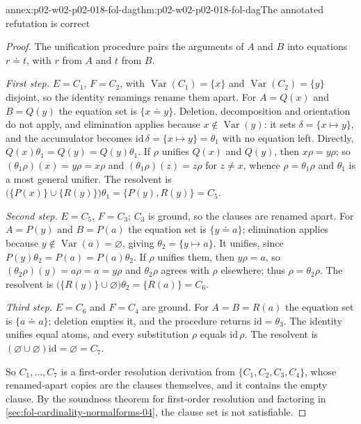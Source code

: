 \begin{annexitem}{annex:p02-w02-p02-018-fol-dag}{thm:p02-w02-p02-018-fol-dag}{The annotated refutation is correct}
\begin{proof}
The unification procedure pairs the arguments of \(A\) and \(B\) into
equations \(r\doteq t\), with \(r\) from \(A\) and \(t\) from \(B\).

\emph{First step.}  \(E=C_1\), \(F=C_2\), with
\(\operatorname{Var}(C_1)=\{x\}\) and \(\operatorname{Var}(C_2)=\{y\}\)
disjoint, so the identity renamings rename them apart.  For \(A=Q(x)\) and
\(B=Q(y)\) the equation set is \(\{x\doteq y\}\).  Deletion, decomposition and
orientation do not apply, and elimination applies because
\(x\notin\operatorname{Var}(y)\): it sets \(\delta=\{x\mapsto y\}\), and the
accumulator becomes \(\mathrm{id}\,\delta=\{x\mapsto y\}=\theta_1\) with no
equation left.  Directly, \(Q(x)\theta_1=Q(y)=Q(y)\theta_1\).  If \(\rho\)
unifies \(Q(x)\) and \(Q(y)\), then \(x\rho=y\rho\); so
\((\theta_1\rho)(x)=y\rho=x\rho\) and \((\theta_1\rho)(z)=z\rho\) for
\(z\ne x\), whence \(\rho=\theta_1\rho\) and \(\theta_1\) is a most general
unifier.  The resolvent is
\(\bigl(\{P(x)\}\cup\{R(y)\}\bigr)\theta_1=\{P(y),R(y)\}=C_5\).

\emph{Second step.}  \(E=C_5\), \(F=C_3\); \(C_3\) is ground, so the clauses
are renamed apart.  For \(A=P(y)\) and \(B=P(a)\) the equation set is
\(\{y\doteq a\}\); elimination applies because \(y\notin\operatorname{Var}(a)
=\varnothing\), giving \(\theta_2=\{y\mapsto a\}\).  It unifies, since
\(P(y)\theta_2=P(a)=P(a)\theta_2\).  If \(\rho\) unifies them, then
\(y\rho=a\), so \((\theta_2\rho)(y)=a\rho=a=y\rho\) and \(\theta_2\rho\)
agrees with \(\rho\) elsewhere; thus \(\rho=\theta_2\rho\).  The resolvent is
\(\bigl(\{R(y)\}\cup\varnothing\bigr)\theta_2=\{R(a)\}=C_6\).

\emph{Third step.}  \(E=C_6\) and \(F=C_4\) are ground.  For \(A=B=R(a)\) the
equation set is \(\{a\doteq a\}\); deletion empties it, and the procedure
returns \(\mathrm{id}=\theta_3\).  The identity unifies equal atoms, and every
substitution \(\rho\) equals \(\mathrm{id}\,\rho\).  The resolvent is
\((\varnothing\cup\varnothing)\mathrm{id}=\varnothing=C_7\).

So \(C_1,\ldots,C_7\) is a first-order resolution derivation from
\(\{C_1,C_2,C_3,C_4\}\), whose renamed-apart copies are the clauses
themselves, and it contains the empty clause.  By the soundness theorem for
first-order resolution and factoring in
\cref{sec:fol-cardinality-normalforms-04}, the clause set is not satisfiable.
\end{proof}
\end{annexitem}
